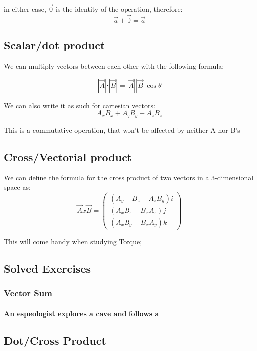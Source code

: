 \documentclass[11pt,fleqn]{book} %
\begin{document}
in either case,  $ \vec{0} $ is the identity of the operation, therefore:
\begin{equation}
    \vec{a} + \vec{0} = \vec{a}
\end{equation}


\subsection{Scalar/dot product}
We can multiply vectors between each other with the following formula:

$$ |\vec{A}| \centerdot |\vec{B}| = |\vec{A}||\vec{B}|\cos \theta $$

We can also write it as such for cartesian vectors:
$$ A_x B_x + A_y B_y + A_z B_z $$

This is a commutative operation, that won't be affected by neither A nor B's 


\subsection{Cross/Vectorial product}

We can define the formula for the cross product of two vectors in a 3-dimensional space
as:
\begin{equation}
    \vec{A} x \vec{B} = 
    \begin{pmatrix}
        (A_y - B_z - A_z B_y) i \\
        (A_x B_z - B_x A_z) j \\
        (A_x B_y - B_x A_y) k   
    \end{pmatrix}
\end{equation}

This will come handy when studying Torque;

\subsection{Solved Exercises}
\subsubsection{Vector Sum}
\paragraph{An espeologist explores a cave and follows a }

\subsection{Dot/Cross Product}
\end{document}
